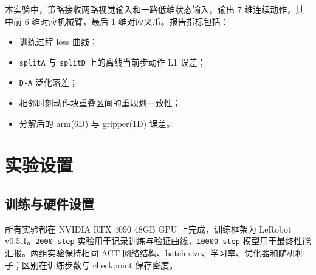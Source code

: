 \documentclass{article}
\begin{document}
本实验中，策略接收两路视觉输入和一路低维状态输入，输出 7 维连续动作，其中前 6 维对应机械臂，最后 1 维对应夹爪。报告指标包括：
\begin{itemize}
  \item 训练过程 loss 曲线；
  \item \texttt{splitA} 与 \texttt{splitD} 上的离线当前步动作 L1 误差；
  \item \texttt{D-A} 泛化落差；
  \item 相邻时刻动作块重叠区间的重规划一致性；
  \item 分解后的 arm(6D) 与 gripper(1D) 误差。
\end{itemize}

\section{实验设置}

\subsection{训练与硬件设置}

所有实验都在 NVIDIA RTX 4090 48GB GPU 上完成，训练框架为 LeRobot v0.5.1。\texttt{2000 step} 实验用于记录训练与验证曲线，\texttt{10000 step} 模型用于最终性能汇报。两组实验保持相同 ACT 网络结构、batch size、学习率、优化器和随机种子；区别在训练步数与 checkpoint 保存密度。
\end{document}
